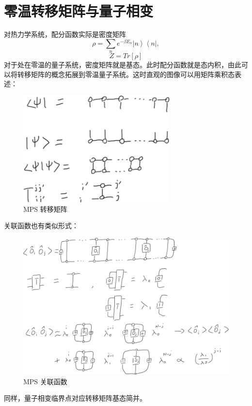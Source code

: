 \documentclass[UTF8]{ctexart}
\begin{document}
\section*{零温转移矩阵与量子相变}
\noindent
对热力学系统，配分函数实际是密度矩阵
\begin{equation}
\rho=\sum_{n}e^{-\beta E_{n}}\left|n\right\rangle \left\langle n\right|,
\end{equation}
\begin{equation}
Z=Tr\left[\rho\right]
\end{equation}
对于处在零温的量子系统，密度矩阵就是基态。此时配分函数就是态内积，由此可以将转移矩阵的概念拓展到零温量子系统。这时直观的图像可以用矩阵乘积态表述：
\begin{figure}[H]
\begin{centering}
\includegraphics[width=8cm]{include/mpstrm}
\par\end{centering}
\caption{MPS 转移矩阵}

\end{figure}

\begin{flushleft}
关联函数也有类似形式：
\par\end{flushleft}

\begin{figure}[H]
\begin{centering}
\includegraphics[width=16cm]{include/mpscor}
\par\end{centering}
\caption{MPS 关联函数}
\end{figure}
\noindent
同样，量子相变临界点对应转移矩阵基态简并。
\end{document}
